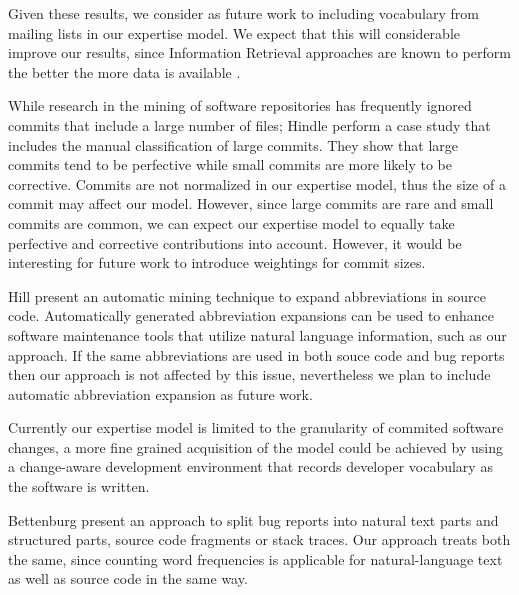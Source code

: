 Given these results, we consider as future work to including vocabulary from mailing lists in our expertise model. We expect that this will considerable improve our results, since Information Retrieval approaches are known to perform the better the more data is available \cite{TheTextminigHandbookOrOther}.

 While research in the mining of software repositories has frequently ignored commits that include a large number of files; 
Hindle \etal \cite{Hind08b} perform a case study that includes the manual classification of large commits. They show that large commits tend to be perfective while small commits are more likely to be corrective. Commits are not normalized in our expertise model, thus the size of a commit may affect our model. However, since large commits are rare and small commits are common, we can expect our expertise model to equally take perfective and corrective contributions into account.
However, it would be interesting for future work to introduce weightings for commit sizes. 

Hill \etal \cite{Hill08a} present an automatic mining technique to expand abbreviations in source code.  Automatically generated abbreviation expansions can be used to enhance software maintenance tools that utilize natural language information, such as our approach. If the same abbreviations are used in both souce code and bug reports then our approach is not affected by this issue, nevertheless we plan to include  automatic abbreviation expansion as future work.

Currently our expertise model is limited to the granularity of commited software changes, a more fine grained acquisition of the model could be achieved by using a change-aware development environment \cite{Omor08a,Robb08a} that records developer vocabulary as the software is written.  

Bettenburg \etal \cite{Bett08c} present an approach to split bug reports into natural text parts and structured parts, \ie source code fragments or stack traces. Our approach treats both the same, since counting word frequencies is applicable for natural-language text as well as source code in the same way.

